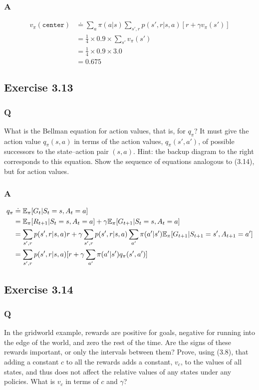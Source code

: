 \subsubsection{A}
\begin{align*}
    v_\pi(\mathtt{center}) &\doteq \sum_a \pi(a | s) \sum_{s', r} p(s', r | s, a)[r + \gamma v_\pi(s')] \\
    & = \frac14 \times 0.9 \times \sum_{s'} v_\pi(s')\\
    & = \frac14 \times 0.9 \times 3.0 \\
    & = 0.675
\end{align*}


\subsection{Exercise 3.13}
\subsubsection{Q}
What is the Bellman equation for action values, that is, for $q_\pi$? It must give the action value $q_\pi(s, a)$ in terms of the action values, $q_\pi(s',a')$, of possible successors to the state–action pair $(s,a)$. Hint: the backup diagram to the right corresponds to this equation. Show the sequence of equations analogous to (3.14), but for action values.

\subsubsection{A}
\begin{align*}
    q_\pi &\doteq \mathbb{E}_\pi[G_t | S_t=s, A_t=a]\\
          &= \mathbb{E}_\pi[R_{t+1}| S_t=s, A_t=a] + \gamma \mathbb{E}_\pi[G_{t+1} |S_t = s, A_t = a] \\
          &= \sum_{s', r} p(s', r|s, a)r + \gamma \sum_{s', r} p(s', r|s, a) \sum_{a'}\pi(a'|s')\mathbb{E}_\pi[G_{t+1}| S_{t+1}=s', A_{t+1}=a'] \\
          &= \sum_{s', r} p(s', r| s, a) [r + \gamma \sum_{a'}\pi(a'|s')q_\pi(s', a')]
\end{align*}


\subsection{Exercise 3.14}
\subsubsection{Q}
In the gridworld example, rewards are positive for goals, negative for running into the edge of the world, and zero the rest of the time. Are the signs of these rewards important, or only the intervals between them? Prove, using (3.8), that adding a constant $c$ to all the rewards adds a constant, $v_c$, to the values of all states, and thus does not affect the relative values of any states under any policies. What is $v_c$ in terms of $c$ and $\gamma$?

